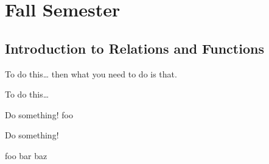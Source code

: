 \documentclass[letterpaper]{memoir}
\begin{document}
\pagestyle{myPagestyle}
\checkandfixthelayout





%
%


\book{\myClassName}
\part{Fall Semester}
\chapter{Introduction to Relations and Functions} 

\begin{myObjectives}
\end{myObjectives}

\begin{myVocabulary}
\end{myVocabulary}

\begin{myConcept}{To do this\dots}
    then what you need to do is that.
\end{myConcept}

\begin{myConceptSteps}{To do this\dots}
\end{myConceptSteps}

\begin{myExample}{Do something!}
    foo
\end{myExample}

\begin{myExample}{Do something!}
    \vspace{.05in}
\end{myExample}


foo bar baz
\end{document}
